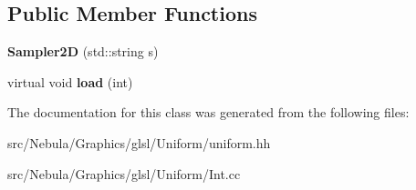 \subsection*{\-Public \-Member \-Functions}
\begin{DoxyCompactItemize}
\item 
\hypertarget{classNeb_1_1glsl_1_1Uniform_1_1Scalar_1_1Sampler2D_a91f35bdd1915418833da9db087bf8689}{{\bfseries \-Sampler2\-D} (std\-::string s)}\label{classNeb_1_1glsl_1_1Uniform_1_1Scalar_1_1Sampler2D_a91f35bdd1915418833da9db087bf8689}

\item 
\hypertarget{classNeb_1_1glsl_1_1Uniform_1_1Scalar_1_1Sampler2D_ac3fc3a3d42b754e6d6a7477e8605a30d}{virtual void {\bfseries load} (int)}\label{classNeb_1_1glsl_1_1Uniform_1_1Scalar_1_1Sampler2D_ac3fc3a3d42b754e6d6a7477e8605a30d}

\end{DoxyCompactItemize}


\-The documentation for this class was generated from the following files\-:\begin{DoxyCompactItemize}
\item 
src/\-Nebula/\-Graphics/glsl/\-Uniform/uniform.\-hh\item 
src/\-Nebula/\-Graphics/glsl/\-Uniform/\-Int.\-cc\end{DoxyCompactItemize}
